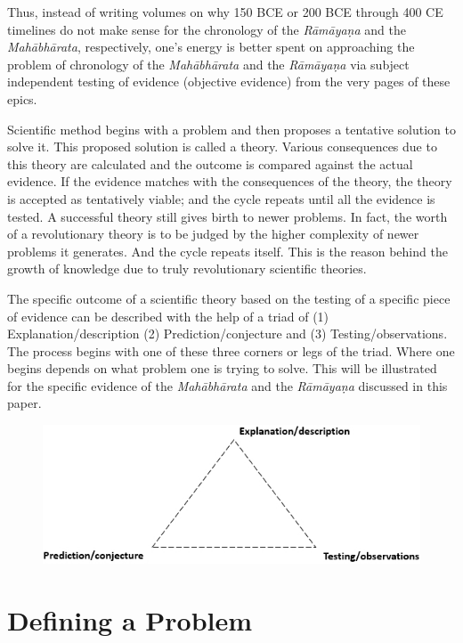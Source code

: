 Thus, instead of writing volumes on why 150 BCE or 200 BCE through 400 CE timelines do not make sense for the chronology of the \textit{Rāmāyaṇa} and the \textit{Mahābhārata}, respectively, one’s energy is better spent on approaching the problem of chronology of the \textit{Mahābhārata} and the \textit{Rāmāyaṇa} via subject independent testing of evidence (objective evidence) from the very pages of these epics.

Scientific method begins with a problem and then proposes a tentative solution to solve it. This proposed solution is called a theory. Various consequences due to this theory are calculated and the outcome is compared against the actual evidence. If the evidence matches with the consequences of the theory, the theory is accepted as tentatively viable; and the cycle repeats until all the evidence is tested. A successful theory still gives birth to newer problems. In fact, the worth of a revolutionary theory is to be judged by the higher complexity of newer problems it generates. And the cycle repeats itself. This is the reason behind the growth of knowledge due to truly revolutionary scientific theories.

The specific outcome of a scientific theory based on the testing of a specific piece of evidence can be described with the help of a triad of (1) Explanation/description (2) Prediction/conjecture and (3) Testing/observations. The process begins with one of these three corners or legs of the triad. Where one begins depends on what problem one is trying to solve. This will be illustrated for the specific evidence of the \textit{Mahābhārata} and the \textit{Rāmāyaṇa} discussed in this paper.

\begin{figure}[!h]
\includegraphics[scale=.5]{images/chap2-1.jpg}
\end{figure}


\section*{Defining a Problem}

